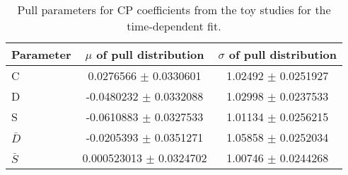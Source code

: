 \begin{table}[hp!]
\centering
\caption{Pull parameters for CP coefficients from the toy studies for the time-dependent fit.}
\begin{tabular}{l | c | c}
\hline
Parameter & $\mu$ of pull distribution & $\sigma$ of pull distribution \\
\hline
\hline
C & 0.0276566 $\pm$ 0.0330601 & 1.02492 $\pm$ 0.0251927 \\
D & -0.0480232 $\pm$ 0.0332088 & 1.02998 $\pm$ 0.0237533 \\
S & -0.0610883 $\pm$ 0.0327533 & 1.01134 $\pm$ 0.0256215 \\
$\bar{D}$ & -0.0205393 $\pm$ 0.0351271 & 1.05858 $\pm$ 0.0252034 \\
$\bar{S}$ & 0.000523013 $\pm$ 0.0324702 & 1.00746 $\pm$ 0.0244268 \\
\hline
\end{tabular}
\label{table:Pulls_tDFit}
\end{table}